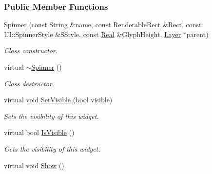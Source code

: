 \subsubsection*{Public Member Functions}
\begin{DoxyCompactItemize}
\item 
\hyperlink{classphys_1_1UI_1_1Spinner_ad82c8fa511a4df09aaa4c7f5872bd5ed}{Spinner} (const \hyperlink{namespacephys_aa03900411993de7fbfec4789bc1d392e}{String} \&name, const \hyperlink{structphys_1_1UI_1_1RenderableRect}{RenderableRect} \&Rect, const UI::SpinnerStyle \&SStyle, const \hyperlink{namespacephys_af7eb897198d265b8e868f45240230d5f}{Real} \&GlyphHeight, \hyperlink{classphys_1_1UI_1_1Layer}{Layer} $\ast$parent)
\begin{DoxyCompactList}\small\item\em Class constructor. \item\end{DoxyCompactList}\item 
\hypertarget{classphys_1_1UI_1_1Spinner_adc7629a1ef57ef62a4e453ce3c66d808}{
virtual \hyperlink{classphys_1_1UI_1_1Spinner_adc7629a1ef57ef62a4e453ce3c66d808}{$\sim$Spinner} ()}
\label{classphys_1_1UI_1_1Spinner_adc7629a1ef57ef62a4e453ce3c66d808}

\begin{DoxyCompactList}\small\item\em Class destructor. \item\end{DoxyCompactList}\item 
virtual void \hyperlink{classphys_1_1UI_1_1Spinner_a4fddc28f38174c4a89761efa00ae88c3}{SetVisible} (bool visible)
\begin{DoxyCompactList}\small\item\em Sets the visibility of this widget. \item\end{DoxyCompactList}\item 
virtual bool \hyperlink{classphys_1_1UI_1_1Spinner_a3bb14ddd6426debf035e65b9885bc25b}{IsVisible} ()
\begin{DoxyCompactList}\small\item\em Gets the visibility of this widget. \item\end{DoxyCompactList}\item 
\hypertarget{classphys_1_1UI_1_1Spinner_ac30c60ae55de67078a09c2d996a694fa}{
virtual void \hyperlink{classphys_1_1UI_1_1Spinner_ac30c60ae55de67078a09c2d996a694fa}{Show} ()}
\label{classphys_1_1UI_1_1Spinner_ac30c60ae55de67078a09c2d996a694fa}


\end{DoxyCompactItemize}
